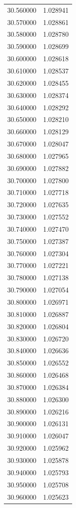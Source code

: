 \begin{tabular}{rr}
30.560000 & 1.028941 \\
30.570000 & 1.028861 \\
30.580000 & 1.028780 \\
30.590000 & 1.028699 \\
30.600000 & 1.028618 \\
30.610000 & 1.028537 \\
30.620000 & 1.028455 \\
30.630000 & 1.028374 \\
30.640000 & 1.028292 \\
30.650000 & 1.028210 \\
30.660000 & 1.028129 \\
30.670000 & 1.028047 \\
30.680000 & 1.027965 \\
30.690000 & 1.027882 \\
30.700000 & 1.027800 \\
30.710000 & 1.027718 \\
30.720000 & 1.027635 \\
30.730000 & 1.027552 \\
30.740000 & 1.027470 \\
30.750000 & 1.027387 \\
30.760000 & 1.027304 \\
30.770000 & 1.027221 \\
30.780000 & 1.027138 \\
30.790000 & 1.027054 \\
30.800000 & 1.026971 \\
30.810000 & 1.026887 \\
30.820000 & 1.026804 \\
30.830000 & 1.026720 \\
30.840000 & 1.026636 \\
30.850000 & 1.026552 \\
30.860000 & 1.026468 \\
30.870000 & 1.026384 \\
30.880000 & 1.026300 \\
30.890000 & 1.026216 \\
30.900000 & 1.026131 \\
30.910000 & 1.026047 \\
30.920000 & 1.025962 \\
30.930000 & 1.025878 \\
30.940000 & 1.025793 \\
30.950000 & 1.025708 \\
30.960000 & 1.025623 \\

\end{tabular}
